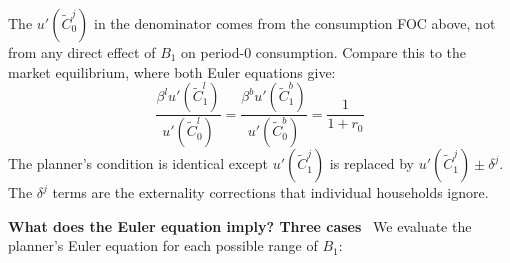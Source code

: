 \documentclass[11pt,a4paper]{article}
\begin{document}
The $u'(\tilde{C}_0^j)$ in the denominator comes from the consumption FOC above, not from any direct effect of $B_1$ on period-0 consumption. Compare this to the market equilibrium, where both Euler equations give:
\begin{equation}
\frac{\beta^l u'(\tilde{C}_1^l)}{u'(\tilde{C}_0^l)} = \frac{\beta^b u'(\tilde{C}_1^b)}{u'(\tilde{C}_0^b)} = \frac{1}{1+r_0}
\end{equation}
The planner's condition is identical except $u'(\tilde{C}_1^j)$ is replaced by $u'(\tilde{C}_1^j) \pm \delta^j$. The $\delta^j$ terms are the externality corrections that individual households ignore.

\textbf{What does the Euler equation imply? Three cases} \ We evaluate the planner's Euler equation for each possible range of $B_1$:
\end{document}
